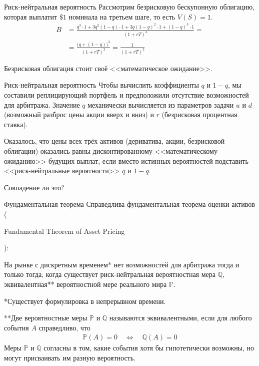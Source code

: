 \documentclass{beamer}
\newcommand{\en}[1]{\begin{otherlanguage}{english}#1\end{otherlanguage}}
\begin{document}
\begin{frame}{Риск-нейтральная вероятность}
\justify
Рассмотрим безрисковую бескупонную облигацию, которая выплатит $\$1$ номинала на третьем шаге, то есть $V(S) = 1$.
\begin{align*}
B &= \frac{q^3 \cdot 1 + 3q^2(1-q) \cdot 1 + 3q(1-q)^2 \cdot 1 + (1-q)^3 \cdot 1}{(1+rT)^3} = \\
&= \frac{\Big(q + (1-q) \Big)^3}{(1+rT)^3} = \frac{1}{(1+rT)^3}
\end{align*}

\justify
Безрисковая облигация стоит своё <<математическое ожидание>>.
\end{frame}



\begin{frame}{Риск-нейтральная вероятность}
\justify
Чтобы вычислить коэффициенты $q$ и $1-q$, мы составили реплицирующий портфель и предположили отсутствие возможностей для арбитража. Значение $q$ механически вычисляется из параметров задачи $u$ и $d$ (возможный разброс цены акции вверх и вниз) и $r$ (безрисковая процентная ставка).

\justify
Оказалось, что цены всех трёх активов (дериватива, акции, безрисковой облигации) оказались равны дисконтированному <<математическому ожиданию>> будущих выплат, если вместо истинных вероятностей подставить <<риск-нейтральные вероятности>> $q$ и $1-q$.

\justify
Совпадение ли это?
\end{frame}



\begin{frame}{Фундаментальная теорема}
\justify
Справедлива фундаментальная теорема оценки активов (\en{Fundamental Theorem of Asset Pricing}):

\justify
На рынке с дискретным временем* нет возможностей для арбитража тогда и только тогда, когда существует риск-нейтральная вероятностная мера $\mathbb{Q}$, эквивалентная** вероятностной мере реального мира $\mathbb{P}$.

\justify
*Существует формулировка в непрерывном времени.

\justify
**Две вероятностные меры $\mathbb{P}$ и $\mathbb{Q}$ называются эквивалентными, если для любого события $A$ справедливо, что
\begin{align*}
\mathbb{P}(A)=0 \quad \Leftrightarrow \quad \mathbb{Q}(A)=0
\end{align*}
Меры $\mathbb{P}$ и $\mathbb{Q}$ согласны в том, какие события хотя бы гипотетически возможны, но могут присваивать им разную вероятность.
\end{frame}
\end{document}
